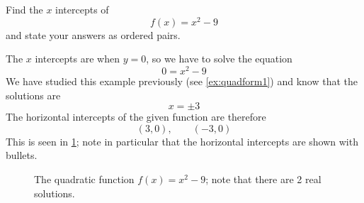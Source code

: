 \begin{myexample}\label{ex:horizints1}
Find the $x$ intercepts of 
\[
	f(x) = x^2-9
\]
and state your answers as ordered pairs.
\end{myexample}
\begin{myProof}
	The $x$ intercepts are when $y=0$, so we have to \gls{solve} the equation
	\[
		0 = x^2-9
	\]
	We have studied this example previously (see \vref{ex:quadform1}) and know
	that the solutions are 
	\[
		x = \pm 3
	\]
	The horizontal intercepts of the given function are therefore
	\[
		(3,0), \qquad (-3,0)
	\]
	This is seen in \cref{fig:quad}; note in particular that the horizontal intercepts
	are shown with bullets.
			
	\begin{figure}[!ht]
		\centering
		\caption{The quadratic function $f(x)=x^2-9$; note that there are 2 real solutions.}
		\label{fig:quad}
	\end{figure}
			
\end{myProof}


